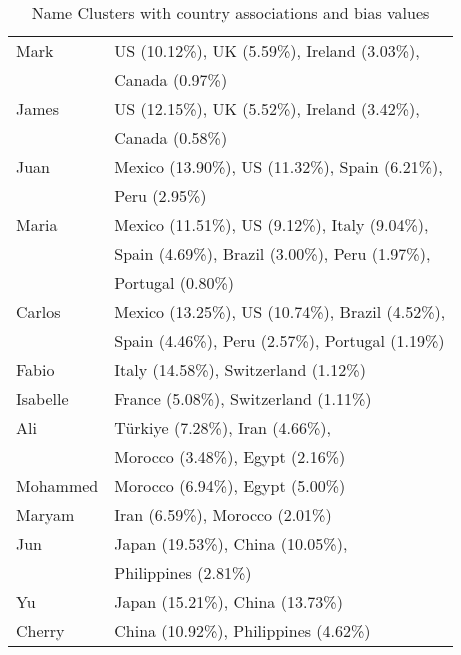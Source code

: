 \addtolength{\tabcolsep}{-3pt}
\begin{table}[!t]
\centering
\fontsize{9pt}{9pt}\selectfont
\renewcommand{\arraystretch}{1.1}
\begin{tabular}{@{}lp{6.0cm}@{}}
\toprule
Mark    & US (10.12\%), UK (5.59\%), Ireland (3.03\%), \\
        & Canada (0.97\%) \\
James   & US (12.15\%), UK (5.52\%), Ireland (3.42\%), \\
        & Canada (0.58\%) \\
\midrule
Juan    & Mexico (13.90\%), US (11.32\%), Spain (6.21\%), \\
        & Peru (2.95\%) \\
Maria   & Mexico (11.51\%), US (9.12\%), Italy (9.04\%), \\
        & Spain (4.69\%), Brazil (3.00\%), Peru (1.97\%), \\
        & Portugal (0.80\%) \\
Carlos  & Mexico (13.25\%), US (10.74\%), Brazil (4.52\%), \\
        & Spain (4.46\%), Peru (2.57\%), Portugal (1.19\%) \\
\midrule
Fabio   & Italy (14.58\%), Switzerland (1.12\%) \\
Isabelle& France (5.08\%), Switzerland (1.11\%) \\

\midrule
Ali     & Türkiye (7.28\%), Iran (4.66\%), \\
        & Morocco (3.48\%), Egypt (2.16\%) \\
Mohammed& Morocco (6.94\%), Egypt (5.00\%) \\
Maryam  & Iran (6.59\%), Morocco (2.01\%) \\
\midrule
Jun     & Japan (19.53\%), China (10.05\%), \\
        & Philippines (2.81\%) \\
Yu      & Japan (15.21\%), China (13.73\%) \\
Cherry  & China (10.92\%), Philippines (4.62\%) \\
\bottomrule
\end{tabular}
\caption{Name Clusters with country associations and bias values}
\label{tab:name_bias}
\end{table}
